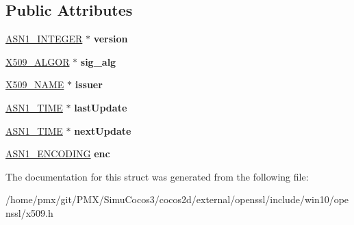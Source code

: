 \subsection*{Public Attributes}
\begin{DoxyCompactItemize}
\item 
\mbox{\label{structX509__crl__info__st_a12cb6a18829a8d4deee72ead8ff4c4e9}} 
\hyperlink{structasn1__string__st}{A\+S\+N1\+\_\+\+I\+N\+T\+E\+G\+ER} $\ast$ {\bfseries version}
\item 
\mbox{\label{structX509__crl__info__st_a9f9d7f31d09d6f5dfd60866725a6d137}} 
\hyperlink{structX509__algor__st}{X509\+\_\+\+A\+L\+G\+OR} $\ast$ {\bfseries sig\+\_\+alg}
\item 
\mbox{\label{structX509__crl__info__st_aae3a87ee2ba5f6fb7dce53ad9c5fd41f}} 
\hyperlink{structX509__name__st}{X509\+\_\+\+N\+A\+ME} $\ast$ {\bfseries issuer}
\item 
\mbox{\label{structX509__crl__info__st_a08aec2ca3fe248541ad5fabbc5cb4762}} 
\hyperlink{structasn1__string__st}{A\+S\+N1\+\_\+\+T\+I\+ME} $\ast$ {\bfseries last\+Update}
\item 
\mbox{\label{structX509__crl__info__st_ac6c7bfd0eb7eb97b75a65ad68ebbea86}} 
\hyperlink{structasn1__string__st}{A\+S\+N1\+\_\+\+T\+I\+ME} $\ast$ {\bfseries next\+Update}
\item 
\mbox{\label{structX509__crl__info__st_a71a2decf2c34f6f0bbb91dbe42479784}} 
\hyperlink{structASN1__ENCODING__st}{A\+S\+N1\+\_\+\+E\+N\+C\+O\+D\+I\+NG} {\bfseries enc}
\end{DoxyCompactItemize}


The documentation for this struct was generated from the following file\+:\begin{DoxyCompactItemize}
\item 
/home/pmx/git/\+P\+M\+X/\+Simu\+Cocos3/cocos2d/external/openssl/include/win10/openssl/x509.\+h\end{DoxyCompactItemize}
